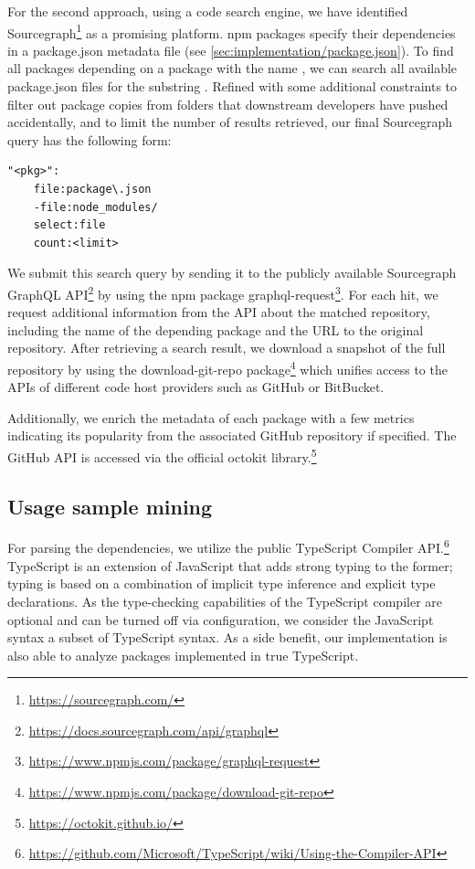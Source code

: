 For the second approach, using a code search engine, we have identified Sourcegraph\footnote{\url{https://sourcegraph.com/}} as a promising platform.
npm packages specify their dependencies in a package.json metadata file (see \cref{sec:implementation/package.json}).
To find all packages depending on a package with the name , we can search all available package.json files for the substring .
Refined with some additional constraints to filter out package copies from  folders that downstream developers have pushed accidentally, and to limit the number of results retrieved, our final Sourcegraph query has the following form:

{
	\lstset{frame=none,
		aboveskip=3mm,
		belowskip=3mm,
		xleftmargin=3mm,
		xrightmargin=3mm
	}
	\begin{lstlisting}[language=sourcegraph]
"<pkg>":
	file:package\.json
	-file:node_modules/
	select:file
	count:<limit>
	\end{lstlisting}
}

We submit this search query by sending it to the publicly available Sourcegraph GraphQL API\footnote{\url{https://docs.sourcegraph.com/api/graphql}} by using the npm package graphql-request\footnote{\url{https://www.npmjs.com/package/graphql-request}}.
For each hit, we request additional information from the API about the matched repository, including the name of the depending package and the URL to the original repository.
After retrieving a search result, we download a snapshot of the full repository by using the download-git-repo package\footnote{\url{https://www.npmjs.com/package/download-git-repo}} which unifies access to the APIs of different code host providers such as GitHub or BitBucket.

Additionally, we enrich the metadata of each package with a few metrics indicating its popularity from the associated GitHub repository if specified.
The GitHub API is accessed via the official octokit library.\footnote{\url{https://octokit.github.io/}}

\subsection{Usage sample mining}
\label{sec:implementation/usage_mining}

For parsing the dependencies, we utilize the public TypeScript Compiler API.\footnote{\url{https://github.com/Microsoft/TypeScript/wiki/Using-the-Compiler-API}}
TypeScript is an extension of JavaScript that adds strong typing to the former; typing is based on a combination of implicit type inference and explicit type declarations.
As the type-checking capabilities of the TypeScript compiler are optional and can be turned off via configuration, we consider the JavaScript syntax a subset of TypeScript syntax.
As a side benefit, our implementation is also able to analyze packages implemented in true TypeScript.


